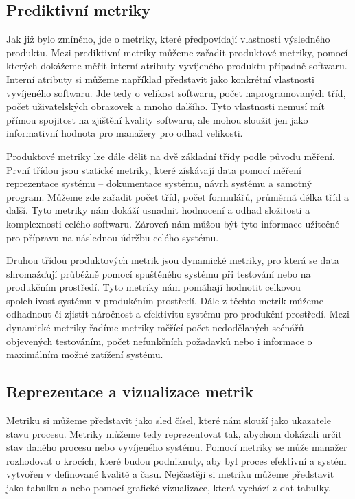 \documentclass[czech,master,public,dept460,male,cpdeclaration,oneside]{diploma}
\begin{document}
\subsection{Prediktivní metriky}
Jak již bylo zmíněno, jde o metriky, které předpovídají vlastnosti výsledného produktu. Mezi prediktivní metriky můžeme zařadit produktové metriky, pomocí kterých dokážeme měřit interní atributy vyvíjeného produktu případně softwaru. Interní atributy si můžeme například představit jako konkrétní vlastnosti vyvíjeného softwaru. Jde tedy o velikost softwaru, počet naprogramovaných tříd, počet uživatelských obrazovek a mnoho dalšího. Tyto vlastnosti nemusí mít přímou spojitost na zjištění kvality softwaru, ale mohou sloužit jen jako informativní hodnota pro manažery pro odhad velikosti.

Produktové metriky lze dále dělit na dvě základní třídy podle původu měření. První třídou jsou statické metriky, které získávají data pomocí měření reprezentace systému -- dokumentace systému, návrh systému a samotný program. Můžeme zde zařadit počet tříd, počet formulářů, průměrná délka tříd a další. Tyto metriky nám dokáží usnadnit hodnocení a odhad složitosti a komplexnosti celého softwaru. Zároveň nám můžou být tyto informace užitečné pro přípravu na následnou údržbu celého systému.

Druhou třídou produktových metrik jsou dynamické metriky, pro která se data shromažďují průběžně pomocí spuštěného systému při testování nebo na produkčním prostředí. Tyto metriky nám pomáhají hodnotit celkovou spolehlivost systému v produkčním prostředí. Dále z těchto metrik můžeme odhadnout či zjistit náročnost a efektivitu systému pro produkční prostředí. Mezi dynamické metriky řadíme metriky měřící počet nedodělaných scénářů objevených testováním, počet nefunkčních požadavků nebo i informace o maximálním možné zatížení systému.

\subsection{Reprezentace a vizualizace metrik}
Metriku si můžeme představit jako sled čísel, které nám slouží jako ukazatele stavu procesu. Metriky můžeme tedy reprezentovat tak, abychom dokázali určit stav daného procesu nebo vyvíjeného systému. Pomocí metriky se může manažer rozhodovat o krocích, které budou podniknuty, aby byl proces efektivní a systém vytvořen v definované kvalitě a času. Nejčastěji si metriku můžeme představit jako tabulku a nebo pomocí grafické vizualizace, která vychází z dat tabulky.
\end{document}
